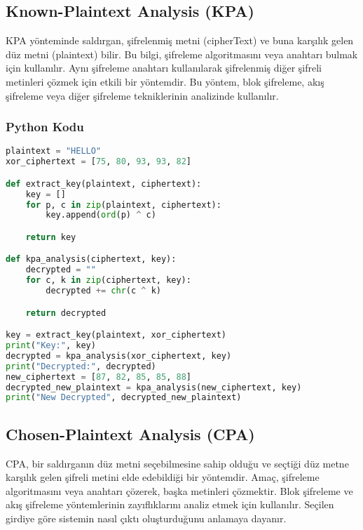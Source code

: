 \newpage

\subsection{Known-Plaintext Analysis (KPA)}

KPA yönteminde saldırgan, şifrelenmiş metni (cipherText) ve buna karşılık gelen düz metni (plaintext) bilir. Bu bilgi, şifreleme algoritmasını veya anahtarı bulmak için kullanılır. Aynı şifreleme anahtarı kullanılarak şifrelenmiş diğer şifreli metinleri çözmek için etkili bir yöntemdir. Bu yöntem, blok şifreleme, akış şifreleme veya diğer şifreleme tekniklerinin analizinde kullanılır.

\subsubsection{Python Kodu}

\begin{lstlisting}[language=Python]
plaintext = "HELLO"
xor_ciphertext = [75, 80, 93, 93, 82]

def extract_key(plaintext, ciphertext):
    key = []
    for p, c in zip(plaintext, ciphertext):
        key.append(ord(p) ^ c)

    return key

def kpa_analysis(ciphertext, key):
    decrypted = ""
    for c, k in zip(ciphertext, key):
        decrypted += chr(c ^ k)

    return decrypted

key = extract_key(plaintext, xor_ciphertext)
print("Key:", key)
decrypted = kpa_analysis(xor_ciphertext, key)
print("Decrypted:", decrypted)
new_ciphertext = [87, 82, 85, 85, 88]
decrypted_new_plaintext = kpa_analysis(new_ciphertext, key)
print("New Decrypted", decrypted_new_plaintext)
\end{lstlisting}

\newpage

\subsection{Chosen-Plaintext Analysis (CPA)}

CPA, bir saldırganın düz metni seçebilmesine sahip olduğu ve seçtiği düz metne karşılık gelen şifreli metini elde edebildiği bir yöntemdir. Amaç, şifreleme algoritmasını veya anahtarı çözerek, başka metinleri çözmektir. Blok şifreleme ve akış şifreleme yöntemlerinin zayıflıklarını analiz etmek için kullanılır. Seçilen girdiye göre sistemin nasıl çıktı oluşturduğunu anlamaya dayanır.

